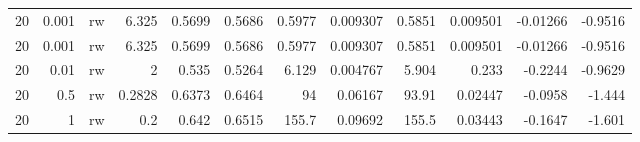 \begin{table}
\begin{tabular}{lrrrrrrrrrrr}
20 & 0.001 & rw & 6.325 & 0.5699 & 0.5686 & 0.5977 & 0.009307 & 0.5851 & 0.009501 & -0.01266 & -0.9516 \\
20 & 0.001 & rw & 6.325 & 0.5699 & 0.5686 & 0.5977 & 0.009307 & 0.5851 & 0.009501 & -0.01266 & -0.9516 \\
20 & 0.01 & rw & 2 & 0.535 & 0.5264 & 6.129 & 0.004767 & 5.904 & 0.233 & -0.2244 & -0.9629 \\
20 & 0.5 & rw & 0.2828 & 0.6373 & 0.6464 & 94 & 0.06167 & 93.91 & 0.02447 & -0.0958 & -1.444 \\
20 & 1 & rw & 0.2 & 0.642 & 0.6515 & 155.7 & 0.09692 & 155.5 & 0.03443 & -0.1647 & -1.601 \\
\bottomrule
\end{tabular}
\end{table}
